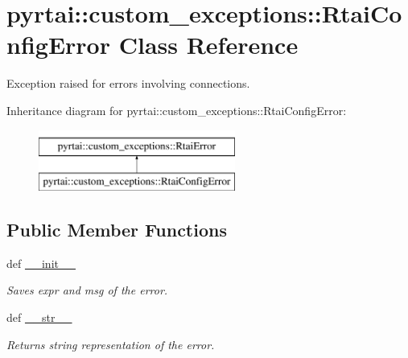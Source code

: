 \hypertarget{classpyrtai_1_1custom__exceptions_1_1_rtai_config_error}{
\section{pyrtai\-:\-:custom\-\_\-exceptions\-:\-:\-Rtai\-Config\-Error \-Class \-Reference}
\label{classpyrtai_1_1custom__exceptions_1_1_rtai_config_error}
}


\-Exception raised for errors involving connections.  


\-Inheritance diagram for pyrtai\-:\-:custom\-\_\-exceptions\-:\-:\-Rtai\-Config\-Error\-:\begin{figure}[H]
\begin{center}
\leavevmode
\includegraphics[height=2.000000cm]{classpyrtai_1_1custom__exceptions_1_1_rtai_config_error}
\end{center}
\end{figure}
\subsection*{\-Public \-Member \-Functions}
\begin{DoxyCompactItemize}
\item 
def \hyperlink{classpyrtai_1_1custom__exceptions_1_1_rtai_config_error_a91d26510a3e36cc429380781cde015c0}{\-\_\-\-\_\-init\-\_\-\-\_\-}
\begin{DoxyCompactList}\small\item\em \-Saves expr and msg of the error. \end{DoxyCompactList}\item 
def \hyperlink{classpyrtai_1_1custom__exceptions_1_1_rtai_config_error_a2cf33638d1e2c3f4299ae7e220713f33}{\-\_\-\-\_\-str\-\_\-\-\_\-}
\begin{DoxyCompactList}\small\item\em \-Returns string representation of the error. \end{DoxyCompactList}\end{DoxyCompactItemize}
